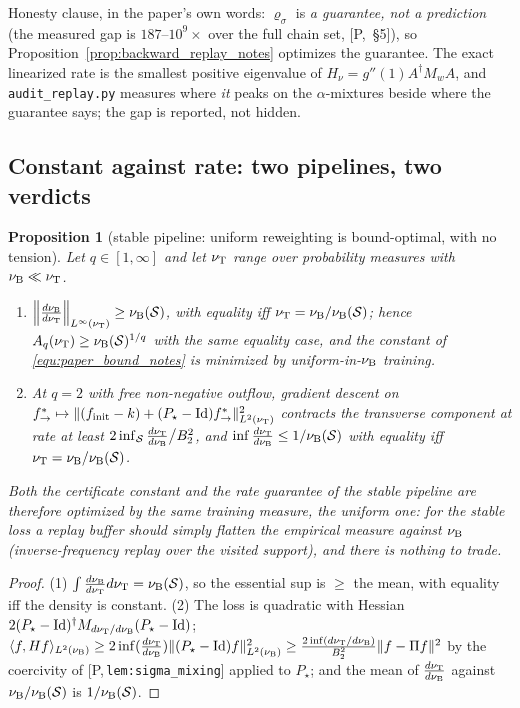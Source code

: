 \documentclass[11pt]{article}
\newtheorem{proposition}[theorem]{Proposition}
\theoremstyle{definition}
\theoremstyle{remark}
\newcommand{\paperref}[1]{[P,\,\texttt{#1}]}   %
\begin{document}
Honesty clause, in the paper's own words: $\varrho_\sigma$ is \emph{a guarantee, not a
prediction} (the measured gap is $187$--$10^9\times$ over the full chain set, [P,~\S5]), so
Proposition~\ref{prop:backward_replay_notes} optimizes the guarantee. The exact linearized rate
is the smallest positive eigenvalue of $H_\nu=g''(1)A^\dagger M_wA$, and
\texttt{audit\_replay.py} measures where \emph{it} peaks on the $\alpha$-mixtures beside
where the guarantee says; the gap is reported, not hidden.

\subsection{Constant against rate: two pipelines, two verdicts}\label{sec:tension_notes}

\begin{proposition}[stable pipeline: uniform reweighting is bound-optimal, with no
tension]\label{prop:stable_uniform_notes}
Let $q\in[1,\infty]$ and let $\nu_{\mathrm{T}}$ range over probability measures with
$\nu_{\mathrm{B}}\ll\nu_{\mathrm{T}}$.
\begin{enumerate}
    \item $\left\|\frac{d\nu_{\mathrm{B}}}{d\nu_{\mathrm{T}}}\right\|_{L^\infty(\nu_{\mathrm{T}})}\geq\nu_{\mathrm{B}}(\mathcal S)$,
    with equality iff $\nu_{\mathrm{T}}=\nu_{\mathrm{B}}/\nu_{\mathrm{B}}(\mathcal S)$; hence
    $A_q(\nu_{\mathrm{T}})\geq\nu_{\mathrm{B}}(\mathcal S)^{1/q}$ with the same equality case, and the
    constant of \eqref{equ:paper_bound_notes} is minimized by uniform-in-$\nu_{\mathrm{B}}$ training.
    \item At $q=2$ with free non-negative outflow, gradient descent on
    $f^*_{\rightarrow}\mapsto\|(f_{\mathrm{init}}-k)+(P_\star-\mathrm{Id})f^*_{\rightarrow}\|^2_{L^2(\nu_{\mathrm{T}})}$
    contracts the transverse component at rate at least
    $2\inf_\mathcal S\frac{d\nu_{\mathrm{T}}}{d\nu_{\mathrm{B}}}\big/B_2^2$, and
    $\inf\frac{d\nu_{\mathrm{T}}}{d\nu_{\mathrm{B}}}\leq1/\nu_{\mathrm{B}}(\mathcal S)$ with equality iff
    $\nu_{\mathrm{T}}=\nu_{\mathrm{B}}/\nu_{\mathrm{B}}(\mathcal S)$.
\end{enumerate}
Both the certificate constant and the rate guarantee of the stable pipeline are therefore
optimized by the \emph{same} training measure, the uniform one: for the stable loss a
replay buffer should simply flatten the empirical measure against $\nu_{\mathrm{B}}$
(inverse-frequency replay over the visited support), and there is nothing to trade.
\end{proposition}

\begin{proof}
(1) $\int\frac{d\nu_{\mathrm{B}}}{d\nu_{\mathrm{T}}}d\nu_{\mathrm{T}}=\nu_{\mathrm{B}}(\mathcal S)$, so the essential sup
is $\geq$ the mean, with equality iff the density is constant.
(2) The loss is quadratic with Hessian $2(P_\star-\mathrm{Id})^\dagger
M_{d\nu_{\mathrm{T}}/d\nu_{\mathrm{B}}}(P_\star-\mathrm{Id})$;
$\langle f,Hf\rangle_{L^2(\nu_{\mathrm{B}})}\geq2\inf(\tfrac{d\nu_{\mathrm{T}}}{d\nu_{\mathrm{B}}})\|(P_\star-\mathrm{Id})f\|^2_{L^2(\nu_{\mathrm{B}})}
\geq\frac{2\inf(d\nu_{\mathrm{T}}/d\nu_{\mathrm{B}})}{B_2^2}\|f-\Pi f\|^2$ by the coercivity of
\paperref{lem:sigma\_mixing} applied to $P_\star$; and the mean of
$\frac{d\nu_{\mathrm{T}}}{d\nu_{\mathrm{B}}}$ against $\nu_{\mathrm{B}}/\nu_{\mathrm{B}}(\mathcal S)$ is
$1/\nu_{\mathrm{B}}(\mathcal S)$.
\end{proof}
\end{document}
